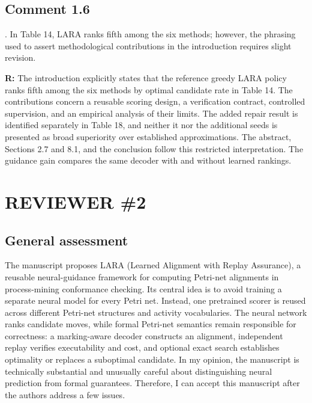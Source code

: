 \documentclass[11pt,a4paper]{article}
\newenvironment{reviewercomment}{%
  \begin{list}{}{\setlength{\leftmargin}{1.5em}%
    \setlength{\rightmargin}{0pt}\setlength{\topsep}{0.5em}}%
  \item\relax\color{reviewerred}\ignorespaces
}{\end{list}}
\begin{document}
\subsection*{Comment 1.6}

\begin{reviewercomment}6. In Table 14, LARA ranks fifth among the six methods; however, the phrasing used to assert methodological contributions in the introduction requires slight revision.\end{reviewercomment}

{\color{black}\textbf{R:} The introduction explicitly states that the reference greedy LARA policy ranks fifth among the six methods by optimal candidate rate in Table 14. The contributions concern a reusable scoring design, a verification contract, controlled supervision, and an empirical analysis of their limits. The added repair result is identified separately in Table 18, and neither it nor the additional seeds is presented as broad superiority over established approximations. The abstract, Sections 2.7 and 8.1, and the conclusion follow this restricted interpretation. The guidance gain compares the same decoder with and without learned rankings.\par}


\section*{REVIEWER \#2}

\subsection*{General assessment}

\begin{reviewercomment}The manuscript proposes LARA (Learned Alignment with Replay Assurance), a reusable neural-guidance framework for computing Petri-net alignments in process-mining conformance checking. Its central idea is to avoid training a separate neural model for every Petri net. Instead, one pretrained scorer is reused across different Petri-net structures and activity vocabularies. The neural network ranks candidate moves, while formal Petri-net semantics remain responsible for correctness: a marking-aware decoder constructs an alignment, independent replay verifies executability and cost, and optional exact search establishes optimality or replaces a suboptimal candidate. In my opinion, the manuscript is technically substantial and unusually careful about distinguishing neural prediction from formal guarantees. Therefore, I can accept this manuscript after the authors address a few issues.\end{reviewercomment}
\end{document}
